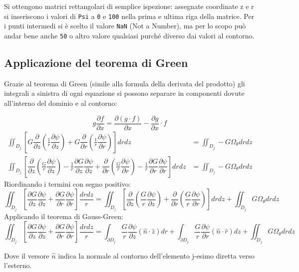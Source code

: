 \documentclass{tufte-handout}
\newcommand{\de}[2]{\dfrac{\partial #1}{\partial #2}}
\begin{document}
Si ottengono matrici rettangolari di semplice ispezione: assegnate coordinate z e r si inseriscono i valori di \texttt{Psi} a \texttt{0} e \texttt{100} nella prima e ultima riga della matrice. Per i punti intermedi si è scelto il valore \texttt{NaN} (Not a Number), ma per lo scopo può andar bene anche \texttt{50} o altro valore qualsiasi purché diverso dai valori al contorno.

\subsection{Applicazione del teorema di Green}
Grazie al teorema di Green (simile alla formula della derivata del prodotto) gli integrali a sinistra di ogni equazione si possono separare in componenti dovute all'interno del dominio e al contorno:
\begin{fullwidth}
\begin{equation*}
    g\de{f}{x}=\de{(g\cdot f)}{x} - \de{g}{x}\cdot f
\end{equation*}
\begin{align*}
    \iint_{D_j} \left[
        G\de{}{z}\left(\frac{1}{r}\de{\psi}{z}\right)
     +  G\de{}{r}\left(\frac{1}{r}\de{\psi}{r}\right)
    \right] dr dz
    &=
    \iint_{D_j} -G\Omega_\theta dr dz\\
    \iint_{D_j} \left[
        \de{}{z}\left(\frac{G}{r}\de{\psi}{z}\right)
        -\frac{1}{r}\de{G}{z}\de{\psi}{z}
        +\de{}{r}\left(\frac{G}{r}\de{\psi}{r}\right)
        -\frac{1}{r}\de{G}{r}\de{\psi}{r}
    \right] dr dz
    &=
    \iint_{D_j} -G\Omega_\theta dr dz
\end{align*}
Riordinando i termini con segno positivo:
\begin{equation*}
    \iint_{D_j} \left[
          \de{G}{z}\de{\psi}{z}
        + \de{G}{r}\de{\psi}{r}
    \right] \frac{dr dz}{r}
    =
    \iint_{D_j} \left[
          \de{}{z}\left(\frac{G}{r}\de{\psi}{z}\right)
        + \de{}{r}\left(\frac{G}{r}\de{\psi}{r}\right)
    \right] dr dz
    +
    \iint_{D_j} G\Omega_\theta dr dz
\end{equation*}
Applicando il teorema di Gauss-Green:
\begin{equation*}
    \iint_{D_j} \left[
          \de{G}{z}\de{\psi}{z}
        + \de{G}{r}\de{\psi}{r}
    \right] \frac{dr dz}{r}
    =
    \int_{\partial D_j}\frac{G}{r}\de{\psi}{z} (\hat{n}\cdot \hat{z})dr
    +
    \int_{\partial D_j}\frac{G}{r}\de{\psi}{r} (\hat{n}\cdot \hat{r})dz
    +
    \iint_{D_j} G\Omega_\theta dr dz
\end{equation*}
\end{fullwidth}
Dove il versore $\hat{n}$ indica la normale al contorno dell'elemento j-esimo diretta verso l'esterno.
\end{document}
